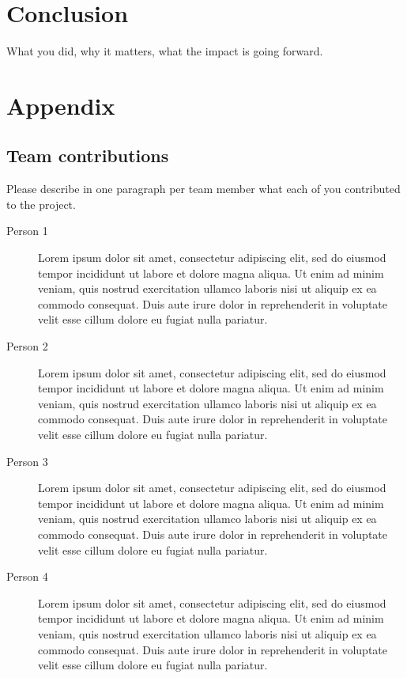 \documentclass[10pt,twocolumn,letterpaper]{article}
\begin{document}
\section{Conclusion}

What you did, why it matters, what the impact is going forward.

{\small


}

\section*{Appendix}

\subsection*{Team contributions}

Please describe in one paragraph per team member what each of you contributed to the project.
\begin{description}
\item[Person 1] Lorem ipsum dolor sit amet, consectetur adipiscing elit, sed do eiusmod tempor incididunt ut labore et dolore magna aliqua. Ut enim ad minim veniam, quis nostrud exercitation ullamco laboris nisi ut aliquip ex ea commodo consequat. Duis aute irure dolor in reprehenderit in voluptate velit esse cillum dolore eu fugiat nulla pariatur. 
\item[Person 2] Lorem ipsum dolor sit amet, consectetur adipiscing elit, sed do eiusmod tempor incididunt ut labore et dolore magna aliqua. Ut enim ad minim veniam, quis nostrud exercitation ullamco laboris nisi ut aliquip ex ea commodo consequat. Duis aute irure dolor in reprehenderit in voluptate velit esse cillum dolore eu fugiat nulla pariatur.
\item [Person 3] Lorem ipsum dolor sit amet, consectetur adipiscing elit, sed do eiusmod tempor incididunt ut labore et dolore magna aliqua. Ut enim ad minim veniam, quis nostrud exercitation ullamco laboris nisi ut aliquip ex ea commodo consequat. Duis aute irure dolor in reprehenderit in voluptate velit esse cillum dolore eu fugiat nulla pariatur. 
\item [Person 4] Lorem ipsum dolor sit amet, consectetur adipiscing elit, sed do eiusmod tempor incididunt ut labore et dolore magna aliqua. Ut enim ad minim veniam, quis nostrud exercitation ullamco laboris nisi ut aliquip ex ea commodo consequat. Duis aute irure dolor in reprehenderit in voluptate velit esse cillum dolore eu fugiat nulla pariatur.
\end{description}
\end{document}
